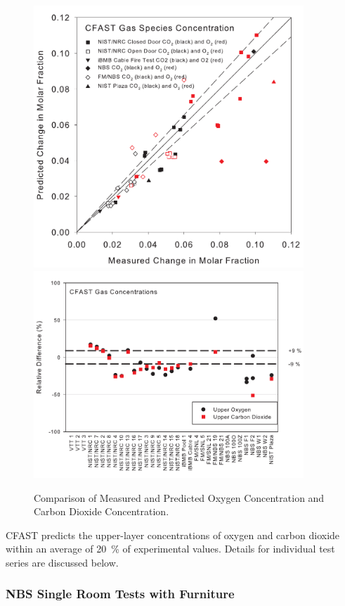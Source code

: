 \begin{figure}
\begin{center}
\includegraphics[width=4.0in]{FIGURES/ScatterPlots/Gases}  \\
\includegraphics[width=4.0in]{FIGURES/Relative_Diff/Gases}
\end{center}
\caption{Comparison of Measured and Predicted Oxygen Concentration and Carbon Dioxide Concentration.} \label{fig:Species_Scatter}
\end{figure}

CFAST predicts the upper-layer concentrations of oxygen and carbon dioxide within an average of 20~\% of experimental values. Details for individual test series are discussed below. 

\subsubsection{NBS Single Room Tests with Furniture}

